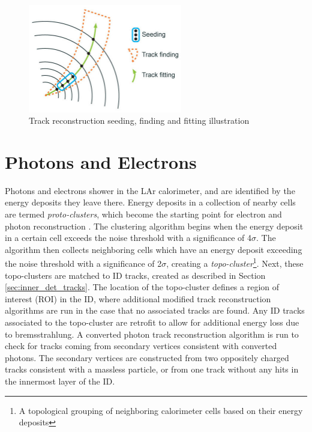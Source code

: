 \begin{figure}
        \centering
	\includegraphics[width=0.6\textwidth]{figures/ch5/track_reco}
	\caption{Track reconstruction seeding, finding and fitting illustration \cite{track_finding}}
	\label{fig:track_reco}
\end{figure}

\section{Photons and Electrons}
Photons and electrons shower in the LAr calorimeter, and are identified by the energy deposits they leave there. Energy deposits in a collection of nearby cells are termed \textit{proto-clusters}, which become the starting point for electron and photon reconstruction \cite{electron_photon}. The clustering algorithm begins when the energy deposit in a certain cell exceeds the noise threshold with a significance of 4$\sigma$. The algorithm then collects neighboring cells which have an energy deposit exceeding the noise threshold with a significance of 2$\sigma$, creating a \textit{topo-cluster}\footnote{A topological grouping of neighboring calorimeter cells based on their energy deposits}. Next, these topo-clusters are matched to ID tracks, created as described in Section \ref{sec:inner_det_tracks}. The location of the topo-cluster defines a region of interest (ROI) in the ID, where additional modified track reconstruction algorithms are run in the case that no associated tracks are found. Any ID tracks associated to the topo-cluster are retrofit to allow for additional energy loss due to bremsstrahlung. A converted photon track reconstruction algorithm is run to check for tracks coming from secondary vertices consistent with converted photons. The secondary vertices are constructed from two oppositely charged tracks consistent with a massless particle, or from one track without any hits in the innermost layer of the ID. \par


